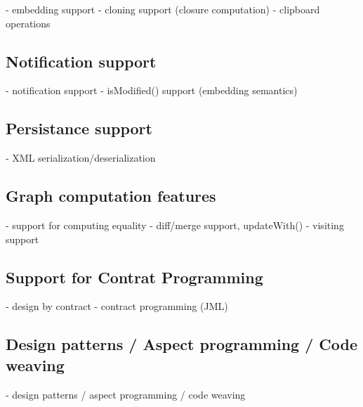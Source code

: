 - embedding support
- cloning support (closure computation)
- clipboard operations

\subsection{Notification support}

- notification support
- isModified() support (embedding semantics)

\subsection{Persistance support}

- XML serialization/deserialization

\subsection{Graph computation features}

- support for computing equality
- diff/merge support, updateWith()
- visiting support



\subsection{Support for Contrat Programming}

- design by contract
- contract programming (JML)


\subsection{Design patterns / Aspect programming / Code weaving}

- design patterns / aspect programming / code weaving



